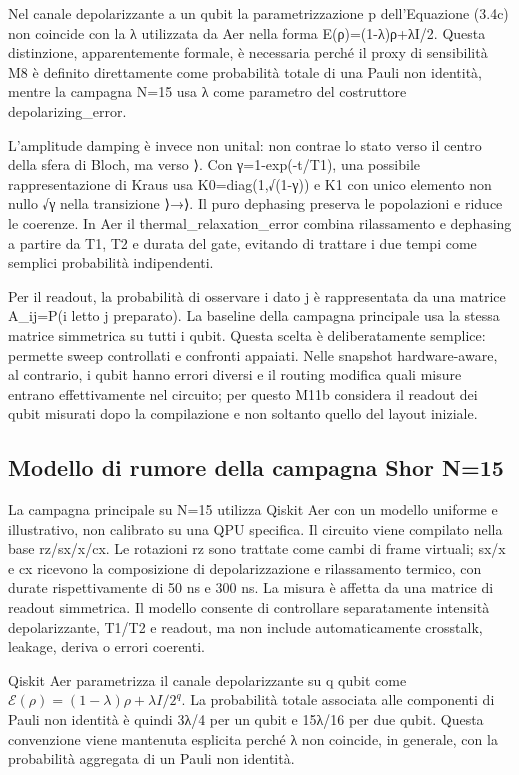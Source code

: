 Nel canale depolarizzante a un qubit la parametrizzazione p dell'Equazione (3.4c) non coincide con la λ utilizzata da Aer nella forma E(ρ)=(1-λ)ρ+λI/2. Questa distinzione, apparentemente formale, è necessaria perché il proxy di sensibilità M8 è definito direttamente come probabilità totale di una Pauli non identità, mentre la campagna N=15 usa λ come parametro del costruttore depolarizing\_error.

L'amplitude damping è invece non unital: non contrae lo stato verso il centro della sfera di Bloch, ma verso ⟩. Con γ=1-exp(-t/T1), una possibile rappresentazione di Kraus usa K0=diag(1,√(1-γ)) e K1 con unico elemento non nullo √γ nella transizione ⟩→⟩. Il puro dephasing preserva le popolazioni e riduce le coerenze. In Aer il thermal\_relaxation\_error combina rilassamento e dephasing a partire da T1, T2 e durata del gate, evitando di trattare i due tempi come semplici probabilità indipendenti.

Per il readout, la probabilità di osservare i dato j è rappresentata da una matrice A\_ij=P(i letto \textbar{} j preparato). La baseline della campagna principale usa la stessa matrice simmetrica su tutti i qubit. Questa scelta è deliberatamente semplice: permette sweep controllati e confronti appaiati. Nelle snapshot hardware-aware, al contrario, i qubit hanno errori diversi e il routing modifica quali misure entrano effettivamente nel circuito; per questo M11b considera il readout dei qubit misurati dopo la compilazione e non soltanto quello del layout iniziale.

\subsection{Modello di rumore della campagna Shor N=15}\label{sec:finale_3_3_3}

La campagna principale su N=15 utilizza Qiskit Aer \cite{qiskit2023} con un modello uniforme e illustrativo, non calibrato su una QPU specifica. Il circuito viene compilato nella base rz/sx/x/cx. Le rotazioni rz sono trattate come cambi di frame virtuali; sx/x e cx ricevono la composizione di depolarizzazione e rilassamento termico, con durate rispettivamente di 50 ns e 300 ns. La misura è affetta da una matrice di readout simmetrica. Il modello consente di controllare separatamente intensità depolarizzante, T1/T2 e readout, ma non include automaticamente crosstalk, leakage, deriva o errori coerenti.

Qiskit Aer parametrizza il canale depolarizzante su q qubit come \ensuremath{\mathcal{E}(\rho)=(1-\lambda)\rho+\lambda I/2^q}. La probabilità totale associata alle componenti di Pauli non identità è quindi 3λ/4 per un qubit e 15λ/16 per due qubit. Questa convenzione viene mantenuta esplicita perché λ non coincide, in generale, con la probabilità aggregata di un Pauli non identità.

